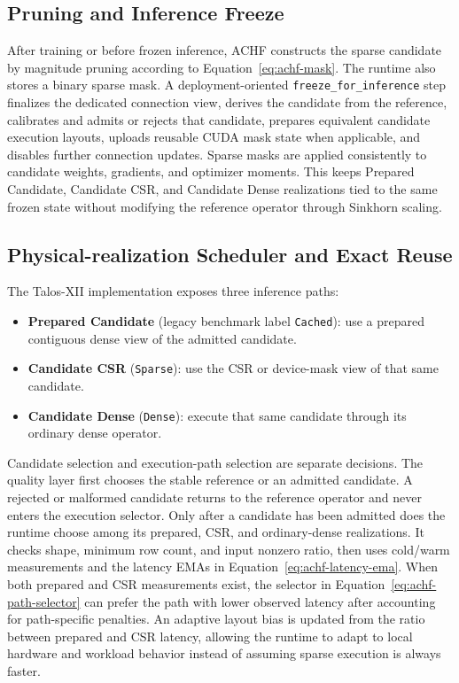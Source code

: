 \documentclass{article}
\newcommand{\achf}{\textsc{ACHF}}
\begin{document}
\subsection{Pruning and Inference Freeze}

After training or before frozen inference, \achf{} constructs the sparse candidate by
magnitude pruning according to Equation~\eqref{eq:achf-mask}. The runtime also
stores a binary sparse mask. A deployment-oriented
\texttt{freeze\_for\_inference} step finalizes the dedicated connection
view, derives the candidate from the reference, calibrates and admits or
rejects that candidate, prepares equivalent candidate execution layouts,
uploads reusable CUDA mask state when applicable, and disables further
connection updates. Sparse masks are applied consistently to candidate weights,
gradients, and optimizer moments. This keeps Prepared Candidate, Candidate CSR,
and Candidate Dense realizations tied to the same frozen state without modifying
the reference operator through Sinkhorn scaling.

\subsection{Physical-realization Scheduler and Exact Reuse}

The Talos-XII implementation exposes three inference paths:

\begin{itemize}[leftmargin=*]
\item \textbf{Prepared Candidate} (legacy benchmark label \texttt{Cached}): use
a prepared contiguous dense view of the admitted candidate.
\item \textbf{Candidate CSR} (\texttt{Sparse}): use the CSR or device-mask view
of that same candidate.
\item \textbf{Candidate Dense} (\texttt{Dense}): execute that same candidate
through its ordinary dense operator.
\end{itemize}

Candidate selection and execution-path selection are separate decisions. The
quality layer first chooses the stable reference or an admitted candidate. A
rejected or malformed candidate returns to the reference operator and never
enters the execution selector. Only after a candidate has been admitted does
the runtime choose among its prepared, CSR, and ordinary-dense
realizations. It checks shape, minimum row count, and input nonzero ratio, then
uses cold/warm measurements and the latency EMAs in
Equation~\eqref{eq:achf-latency-ema}. When both prepared and CSR measurements
exist, the selector in Equation~\eqref{eq:achf-path-selector} can prefer the
path with lower observed latency after accounting for path-specific penalties.
An adaptive layout bias is updated from the ratio between prepared and CSR
latency, allowing the runtime to adapt to local hardware and workload behavior
instead of assuming sparse execution is always faster.
\end{document}
